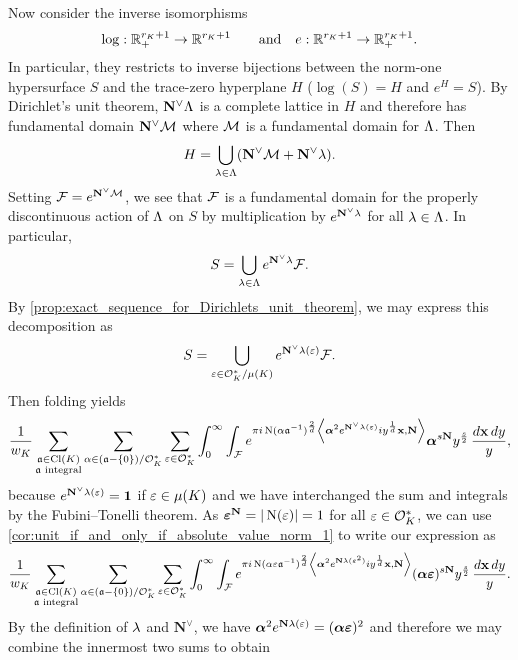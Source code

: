       Now consider the inverse isomorphisms
      \[
        \log:\mathbb{R}_{+}^{r_{K}+1} \to \mathbb{R}^{r_{K}+1} \qquad \text{and} \quad e:\mathbb{R}^{r_{K}+1} \to \mathbb{R}_{+}^{r_{K}+1}.
      \]
      In particular, they restricts to inverse bijections between the norm-one hypersurface $S$ and the trace-zero hyperplane $H$ ($\log(S) = H$ and $e^{H} = S$). By Dirichlet's unit theorem, $\mathbf{N}^{\vee}\Lambda$ is a complete lattice in $H$ and therefore has fundamental domain $\mathbf{N}^{\vee}\mathcal{M}$ where $\mathcal{M}$ is a fundamental domain for $\Lambda$. Then
      \[
        H = \bigcup_{\lambda \in \Lambda}(\mathbf{N}^{\vee}\mathcal{M}+\mathbf{N}^{\vee}\lambda).
      \]
      Setting $\mathcal{F} = e^{\mathbf{N}^{\vee}\mathcal{M}}$, we see that $\mathcal{F}$ is a fundamental domain for the properly discontinuous action of $\Lambda$ on $S$ by multiplication by $e^{\mathbf{N}^{\vee}\lambda}$ for all $\lambda \in \Lambda$. In particular,
      \[
        S = \bigcup_{\lambda \in \Lambda}e^{\mathbf{N}^{\vee}\lambda}\mathcal{F}.
      \]
      By \cref{prop:exact_sequence_for_Dirichlets_unit_theorem}, we may express this decomposition as
      \[
        S = \bigcup_{\varepsilon \in \mathcal{O}_{K}^{\ast}/\mu(K)}e^{\mathbf{N}^{\vee}\lambda(\varepsilon)}\mathcal{F}.
      \]
      Then folding yields
      \[
        \frac{1}{w_{K}}\sum_{\substack{\mathfrak{a} \in \operatorname{\mathrm{Cl}}(K) \\ \text{$\mathfrak{a}$ integral}}}\sum_{\alpha \in (\mathfrak{a}-\{0\})/\mathcal{O}_{K}^{\ast}}\sum_{\varepsilon \in \mathcal{O}_{K}^{\ast}}\int_{0}^{\infty}\int_{\mathcal{F}}e^{\pi i\operatorname{\mathrm{N}}(\alpha\mathfrak{a}^{-1})^{\frac{2}{d}}\left\langle\boldsymbol{\alpha}^{2}e^{\mathbf{N}^{\vee}\lambda(\varepsilon)}iy^{\frac{1}{d}}\mathbf{x},\mathbf{N}\right\rangle}\boldsymbol{\alpha}^{s\mathbf{N}}y^{\frac{s}{2}}\,\frac{d\mathbf{x}\,dy}{y},
      \]
      because $e^{\mathbf{N}^{\vee}\lambda(\varepsilon)} = \mathbf{1}$ if $\varepsilon \in \mu(K)$ and we have interchanged the sum and integrals by the Fubini–Tonelli theorem. As $\boldsymbol{\varepsilon}^{\mathbf{N}} = |\operatorname{\mathrm{N}}(\varepsilon)| = 1$ for all $\varepsilon \in \mathcal{O}_{K}^{\ast}$, we can use \cref{cor:unit_if_and_only_if_absolute_value_norm_1} to write our expression as
      \[
        \frac{1}{w_{K}}\sum_{\substack{\mathfrak{a} \in \operatorname{\mathrm{Cl}}(K) \\ \text{$\mathfrak{a}$ integral}}}\sum_{\alpha \in (\mathfrak{a}-\{0\})/\mathcal{O}_{K}^{\ast}}\sum_{\varepsilon \in \mathcal{O}_{K}^{\ast}}\int_{0}^{\infty}\int_{\mathcal{F}}e^{\pi i\operatorname{\mathrm{N}}(\alpha\varepsilon\mathfrak{a}^{-1})^{\frac{2}{d}}\left\langle\boldsymbol{\alpha}^{2}e^{\mathbf{N}\lambda(\varepsilon^{2})}iy^{\frac{1}{d}}\mathbf{x},\mathbf{N}\right\rangle}(\boldsymbol{\alpha}\boldsymbol{\varepsilon})^{s\mathbf{N}}y^{\frac{s}{2}}\,\frac{d\mathbf{x}\,dy}{y}.
      \]
      By the definition of $\lambda$ and $\mathbf{N}^{\vee}$, we have $\boldsymbol{\alpha}^{2}e^{\mathbf{N}\lambda(\varepsilon)} = (\boldsymbol{\alpha\varepsilon})^{2}$ and therefore we may combine the innermost two sums to obtain
